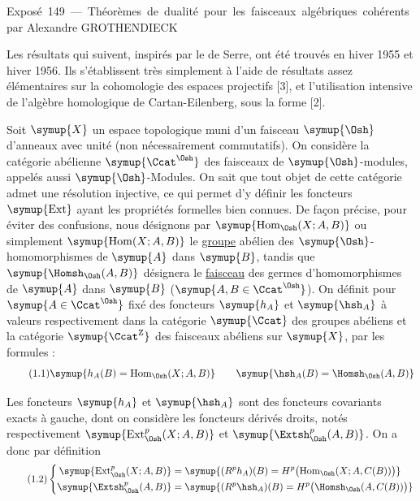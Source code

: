 \unit{Exposé 149 — Théorèmes de dualité pour les faisceaux algébriques cohérents}
%
  {par Alexandre GROTHENDIECK}

Les résultats qui suivent, inspirés par le 
de Serre, ont été trouvés en hiver 1955 et hiver 1956. Ils s'établissent très
simplement à l'aide de résultats assez élémentaires sur la cohomologie des espaces
projectifs [3], et l'utilisation intensive de l'algèbre homologique de
Cartan-Eilenberg, sous la forme [2].


Soit $\symup{X}$ un espace topologique muni d'un faisceau $\symup{\Osh}$ d'anneaux avec unité
(non nécessairement commutatifs). On considère la catégorie abélienne
$\symup{\Ccat^{\Osh}}$ des faisceaux de $\symup{\Osh}$-modules, appelés aussi $\symup{\Osh}$-Modules.
On sait que tout objet de cette catégorie admet une résolution injective, ce qui
permet d'y définir les foncteurs $\symup{\operatorname{Ext}}$ ayant les propriétés
formelles bien connues. De façon précise, pour éviter des confusions, nous
désignons par $\symup{\operatorname{Hom}_{\Osh}(X;A,B)}$ ou simplement
$\symup{\operatorname{Hom}(X;A,B)}$ le \underline{groupe} abélien des $\symup{\Osh}$-homomorphismes de $\symup{A}$
dans $\symup{B}$, tandis que $\symup{\Homsh_{\Osh}(A,B)}$ désignera le \underline{faisceau} des germes
d'homomorphismes de $\symup{A}$ dans $\symup{B}$ ($\symup{A,B\in\Ccat^{\Osh}}$). On définit pour
$\symup{A\in\Ccat^{\Osh}}$ fixé des foncteurs $\symup{h_A}$ et $\symup{\hsh_A}$ à valeurs respectivement
dans la catégorie $\symup{\Ccat}$ des groupes abéliens et la catégorie
$\symup{\Ccat^{\mathrm Z}}$ des faisceaux abéliens sur $\symup{X}$, par les formules :
\begin{equation}\tag{1.1}
  \symup{h_A(B)=\operatorname{Hom}_{\Osh}(X;A,B)}
  \qquad
  \symup{\hsh_A(B)=\Homsh_{\Osh}(A,B)}
\end{equation}

Les foncteurs $\symup{h_A}$ et $\symup{\hsh_A}$ sont des foncteurs covariants exacts à gauche,
dont on considère les foncteurs dérivés droits, notés respectivement
$\symup{\operatorname{Ext}_{\Osh}^{p}(X;A,B)}$ et $\symup{\Extsh_{\Osh}^{p}(A,B)}$. On a donc
par définition
\begin{equation}\tag{1.2}
\left\{
\begin{aligned}
\symup{\operatorname{Ext}_{\Osh}^{p}(X;A,B)}
  &= \symup{(R^{p}h_A)(B)
   = H^{p}\bigl(\operatorname{Hom}_{\Osh}(X;A,C(B))\bigr)}\\
\symup{\Extsh_{\Osh}^{p}(A,B)}
  &= \symup{(R^{p}\hsh_A)(B)
   = H^{p}\bigl(\Homsh_{\Osh}(A,C(B))\bigr)}
\end{aligned}
\right.
\end{equation}

